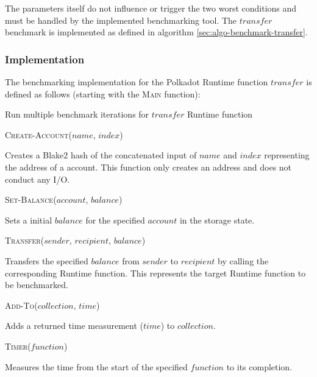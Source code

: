 \documentclass[11pt,a4paper]{article}
\newcommand{\SubItem}[1]{
    {\setlength\itemindent{15pt} \item[-] #1}
}
\begin{document}
The parameters itself do not influence or trigger the two worst conditions and
must be handled by the implemented benchmarking tool. The $transfer$ benchmark
is implemented as defined in algorithm \ref{sec:algo-benchmark-transfer}.

\subsubsection*{Implementation}
The benchmarking implementation for the Polkadot Runtime function $transfer$ is
defined as follows (starting with the \textsc{Main} function):
\newline

\begin{algorithm}[H]\label{sec:algo-benchmark-transfer}
  \caption{Run multiple benchmark iterations for $transfer$ Runtime function}
  \SetAlgoLined {} \BlankLine {} \BlankLine {}
\end{algorithm}

\begin{itemize}
  \item \textsc{Create-Account($name$, $index$)} \SubItem{Creates a Blake2 hash
      of the concatenated input of $name$ and $index$ representing the address
      of a account. This function only creates an address and does not conduct
      any I/O.}
  \item \textsc{Set-Balance($account$, $balance$)} \SubItem{Sets a initial
      $balance$ for the specified $account$ in the storage state.}
  \item \textsc{Transfer($sender$, $recipient$, $balance$)} \SubItem{Transfers
      the specified $balance$ from $sender$ to $recipient$ by calling the
      corresponding Runtime function. This represents the target Runtime
      function to be benchmarked.}
  \item \textsc{Add-To($collection$, $time$)} \SubItem{Adds a returned time
      measurement ($time$) to $collection$.}
  \item \textsc{Timer($function$)} \SubItem{Measures the time from the start of
      the specified $function$ to its completion.}
\end{itemize}
\end{document}
